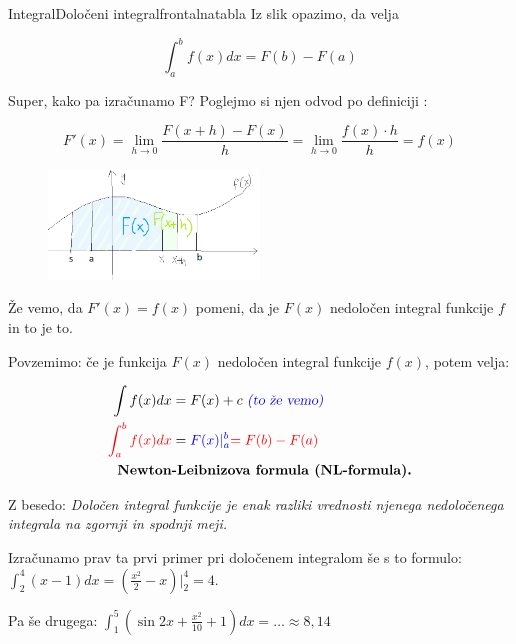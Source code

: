 \begin{priprava}{}{}{Integral}{Določeni integral}{frontalna}{tabla}
Iz slik opazimo, da velja

$$ \int_a^b f(x) dx = F(b) - F(a) $$

Super, kako pa izračunamo F? Poglejmo si njen odvod po definiciji :

$$
F'(x) = \lim_{h \rightarrow 0} \frac{F(x + h) - F(x)}{h} = \lim_{h \rightarrow 0} \frac{f(x) \cdot h}{h} = f(x)
$$

\begin{figure}[h]
    \centering
    \includegraphics[width=0.5\textwidth]{slike/NL_P(x)_P(x+h).png}
\end{figure}

\newpage

Že vemo, da $ F'(x) = f(x) $ pomeni, da je $ F(x) $ nedoločen integral funkcije $ f $  in to je to. 


Povzemimo: če je funkcija $ F(x) $ nedoločen integral funkcije $ f(x) $, potem velja:

\begin{align*}
    \int f(x) dx & = F(x) + c \text{ \didopomba{to že vemo}} \\
    \textcolor{rdeca}{\int_a^b f(x) dx} & = \textcolor{modra}{F(x)|_a^b} \textcolor{rdeca}{= F(b) - F(a)} \\
    \text{ \textbf{Newton}} & \text{\textbf{-Leibnizova formula (NL-formula).}}
\end{align*}


Z besedo: \emph{Določen integral funkcije je enak razliki vrednosti njenega nedoločenega integrala na zgornji in spodnji meji.}

Izračunamo prav ta prvi primer pri določenem integralom še s to formulo: $ \int_2^4 (x - 1) dx = (\frac{x^2}{2} - x) |_2^4 = 4 $.

Pa še drugega: $ \int_1^5 (\sin{2x}+\frac{x^2}{10} + 1) dx = \ldots \approx 8,14 $


\end{priprava}
